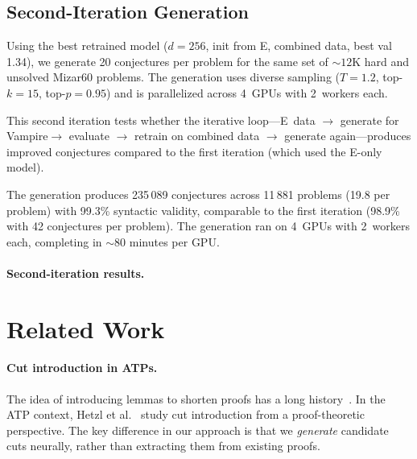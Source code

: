 \documentclass{easychair}
\newcommand{\Eprover}{E\xspace}
\newcommand{\Vampire}{Vampire\xspace}
\begin{document}
\subsection{Second-Iteration Generation}

Using the best retrained model ($d{=}256$, init from E, combined
data, best val 1.34), we generate 20 conjectures per problem for the
same set of ${\sim}12$K hard and unsolved Mizar60 problems.  The
generation uses diverse sampling ($T{=}1.2$, top-$k{=}15$,
top-$p{=}0.95$) and is parallelized across 4~GPUs with 2~workers
each.

This second iteration tests whether the iterative
loop---\Eprover~data $\to$ generate for \Vampire $\to$ evaluate
$\to$ retrain on combined data $\to$ generate again---produces
improved conjectures compared to the first iteration (which used
the \Eprover-only model).

The generation produces 235\,089 conjectures across 11\,881 problems
(19.8 per problem) with 99.3\% syntactic validity, comparable to the
first iteration (98.9\% with 42 conjectures per problem).  The
generation ran on 4~GPUs with 2~workers each, completing in
${\sim}80$ minutes per GPU.

\paragraph{Second-iteration results.}


\section{Related Work}
\label{sec:related}

\paragraph{Cut introduction in ATPs.}
The idea of introducing lemmas to shorten proofs has a long
history~\cite{Gentzen1935}.  In the ATP context, Hetzl et
al.~\cite{Hetzl2014} study cut introduction from a proof-theoretic
perspective.  The key difference in our approach is that we
\emph{generate} candidate cuts neurally, rather than extracting them
from existing proofs.
\end{document}
